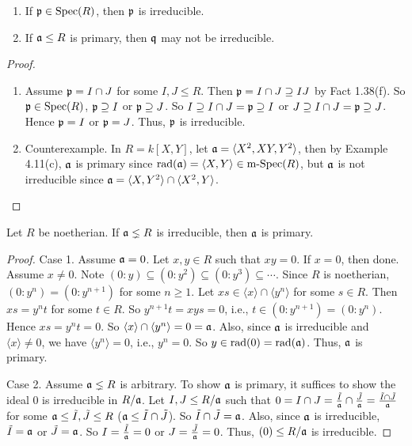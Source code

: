 \begin{example}
    \begin{enumerate}
        \item If $\mathfrak{p} \in \operatorname{Spec}(R)$, then $\mathfrak{p}$ is irreducible.
        \item If $\mathfrak{a} \leq R$ is primary, then $\mathfrak{q}$ may not be irreducible.
    \end{enumerate}
\end{example}

\begin{proof}
    \begin{enumerate}
        \item
            Assume $\mathfrak{p} = I \cap J$ for some $I,J \leq R$. Then $\mathfrak{p} = I \cap J \supseteq IJ$ by Fact 1.38(f). So $\mathfrak{p} \in \operatorname{Spec}(R)$, $\mathfrak{p} \supseteq I$ or $\mathfrak{p} \supseteq J$. So $I \supseteq I \cap J = \mathfrak{p} \supseteq I$ or $J \supseteq I \cap J = \mathfrak{p} \supseteq J$. Hence $\mathfrak{p} = I$ or $\mathfrak{p} = J$. Thus, $\mathfrak{p}$ is irreducible.
        \item 
            Counterexample. In $R = k[X,Y]$, let $\mathfrak{a} = \langle X^{2},XY,Y^{2} \rangle$, then by Example 4.11(c), $\mathfrak{a}$ is primary since $\operatorname{rad}(\mathfrak{a}) = \langle X,Y \rangle \in \operatorname{m-Spec}(R)$, but $\mathfrak{a}$ is not irreducible since $\mathfrak{a} = \langle X,Y^{2} \rangle \cap \langle X^{2},Y \rangle$. \qedhere
    \end{enumerate}
\end{proof}

\begin{proposition}
    Let $R$ be noetherian. If $\mathfrak{a} \lneq R$ is irreducible, then $\mathfrak{a}$ is primary.
\end{proposition}

\begin{proof}
    Case 1. Assume $\mathfrak{a} = 0$. Let $x,y \in R$ such that $xy = 0$. If $x = 0$, then done. Assume $x \neq 0$. Note $(0:y) \subseteq (0:y^{2}) \subseteq (0:y^{3}) \subseteq \cdots$. Since $R$ is noetherian, $(0:y^{n}) = (0:y^{n+1})$ for some $n \geq 1$. Let $xs \in \langle x \rangle \cap \langle y^{n} \rangle$ for some $s \in R$. Then $xs = y^{n}t$ for some $t \in R$. So $y^{n+1}t = xys = 0$, i.e., $t \in (0:y^{n+1}) = (0:y^{n})$. Hence $xs = y^{n}t = 0$. So $\langle x \rangle \cap \langle y^{n} \rangle = 0 = \mathfrak{a}$. Also, since $\mathfrak{a}$ is irreducible and $\langle x \rangle \neq 0$, we have $\langle y^{n} \rangle = 0$, i.e., $y^{n} = 0$. So $y \in \operatorname{rad}(0) = \operatorname{rad}(\mathfrak{a})$. Thus, $\mathfrak{a}$ is primary. \par 
    Case 2. Assume $\mathfrak{a} \lneq R$ is arbitrary. To show $\mathfrak{a}$ is primary, it suffices to show the ideal $0$ is irreducible in $R/\mathfrak{a}$. Let $I,J \leq R/\mathfrak{a}$ such that $0 = I \cap J = \frac{\tilde I}{\mathfrak{a}} \cap \frac{\tilde J}{\mathfrak{a}} = \frac{\tilde I \cap \tilde J}{\mathfrak{a}}$ for some $\mathfrak{a} \leq \tilde I,\tilde J \leq R$ ($\mathfrak{a} \leq \tilde I \cap \tilde J$). So $\tilde I \cap \tilde J = \mathfrak{a}$. Also, since $\mathfrak{a}$ is irreducible, $\tilde I = \mathfrak{a}$ or $\tilde J = \mathfrak{a}$. So $I = \frac{\tilde I}{\mathfrak{a}} = 0$ or $J = \frac{\tilde J}{\mathfrak{a}} = 0$. Thus, $(0) \leq R/\mathfrak{a}$ is irreducible.
\end{proof}

